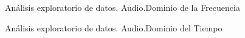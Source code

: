 \begin{frame}{Análisis exploratorio de datos. Audio.\newline Dominio de la Frecuencia}
\end{frame}
\begin{frame}{Análisis exploratorio de datos. Audio.\newline Dominio del Tiempo}
\end{frame}